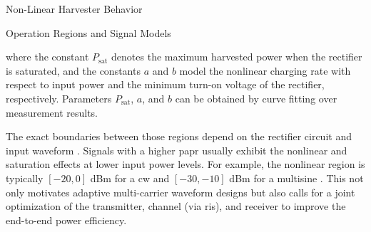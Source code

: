 \begin{section}{}
\begin{subsection}{Non-Linear Harvester Behavior}
\begin{subsubsection}{Operation Regions and Signal Models}
\begin{itemize}
\begin{equation}
					\label{eq:saturation_model}
				\end{equation}
				where the constant $P_{\text{sat}}$ denotes the maximum harvested power when the rectifier is saturated, and the constants $a$ and $b$ model the nonlinear charging rate with respect to input power and the minimum turn-on voltage of the rectifier, respectively.
				Parameters $P_{\text{sat}}$, $a$, and $b$ can be obtained by curve fitting over measurement results.
			\end{itemize}

			The exact boundaries between those regions depend on the rectifier circuit and input waveform \citep{Zeng2017}.
			Signals with a higher \gls{papr} usually exhibit the nonlinear and saturation effects at lower input power levels.
			For example, the nonlinear region is typically $[-20,0]$ dBm for a \gls{cw} and $[-30,-10]$ dBm for a multisine \citep{DelPrete2016}.
			This not only motivates adaptive multi-carrier waveform designs \cite{Clerckx2016a,Zeng2017,Huang2017,Shen2021} but also calls for a joint optimization of the transmitter, channel (via \gls{ris}), and receiver to improve the end-to-end power efficiency.
		\end{subsubsection}
	\end{subsection}
\end{section}

